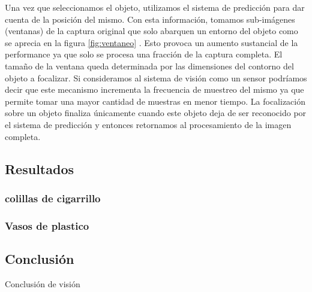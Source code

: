 	\indent Una vez que seleccionamos el objeto, utilizamos el sistema de predicción para dar cuenta de la posición del mismo. Con esta información, tomamos sub-imágenes (ventanas) de la captura original que solo abarquen un entorno del objeto como se aprecia en la figura \ref{fig:ventaneo} . Esto provoca un aumento sustancial de la performance ya que solo se procesa una fracción de la captura completa. El tamaño de la ventana queda determinada por las dimensiones del contorno del objeto a focalizar. Si consideramos al sistema de visión como un sensor podríamos decir que este mecanismo incrementa la frecuencia de muestreo del mismo ya que permite tomar una mayor cantidad de muestras en menor tiempo. La focalización sobre un objeto finaliza únicamente cuando este objeto deja de ser reconocido por el sistema de predicción y entonces retornamos al  procesamiento de la imagen completa. 


	
	
\subsection{Resultados}
\subsubsection{colillas de cigarrillo}
\subsubsection{Vasos de plastico}
	
	
\subsection{Conclusi\'on}
Conclusi\'on de visi\'on

